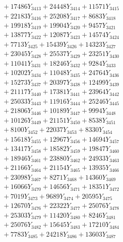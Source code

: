 \documentclass[a4paper,10pt]{article}
\begin{document}
{\begin{align}
&\;  + 17486 Y_{3413} + 24448 Y_{3414} + 11571 Y_{3415} \\[0.3ex]
&\;  + 22183 Y_{3416} + 25208 Y_{3417} + 8683 Y_{3418} \\[0.5ex]\allowbreak
&\;  + 19918 Y_{3419} + 19904 Y_{3420} + 9457 Y_{3421} \\[0.3ex]
&\;  + 13877 Y_{3422} + 12087 Y_{3423} + 14574 Y_{3424} \\[0.3ex]
&\;  + 7713 Y_{3425} + 15439 Y_{3426} + 14323 Y_{3427} \\[0.3ex]
&\;  + 23045 Y_{3428} + 25537 Y_{3429} + 23251 Y_{3430} \\[0.3ex]
&\;  + 11041 Y_{3431} + 18246 Y_{3432} + 9284 Y_{3433} \\[0.3ex]
&\;  + 10202 Y_{3434} + 11048 Y_{3435} + 24764 Y_{3436} \\[0.3ex]
&\;  + 15273 Y_{3437} + 20397 Y_{3438} + 12499 Y_{3439} \\[0.3ex]
&\;  + 21117 Y_{3440} + 17381 Y_{3441} + 23964 Y_{3442} \\[0.3ex]
&\;  + 25033 Y_{3443} + 11916 Y_{3444} + 25246 Y_{3445} \\[0.3ex]
&\;  + 21806 Y_{3446} + 10189 Y_{3447} + 9994 Y_{3448} \\[0.5ex]\allowbreak
&\;  + 10126 Y_{3449} + 21151 Y_{3450} + 8538 Y_{3451} \\[0.3ex]
&\;  + 8100 Y_{3452} + 22037 Y_{3453} + 8330 Y_{3454} \\[0.3ex]
&\;  + 15618 Y_{3455} + 12967 Y_{3456} + 14694 Y_{3457} \\[0.3ex]
&\;  + 13417 Y_{3458} + 18582 Y_{3459} + 19847 Y_{3460} \\[0.3ex]
&\;  + 18946 Y_{3461} + 23880 Y_{3462} + 24933 Y_{3463} \\[0.3ex]
&\;  + 21166 Y_{3464} + 21154 Y_{3465} + 13935 Y_{3466} \\[0.3ex]
&\;  + 23098 Y_{3467} + 8271 Y_{3468} + 14360 Y_{3469} \\[0.3ex]
&\;  + 16066 Y_{3470} + 14656 Y_{3471} + 18351 Y_{3472} \\[0.3ex]
&\;  + 7019 Y_{3473} + 9689 Y_{3474} + 20595 Y_{3475} \\[0.3ex]
&\;  + 12670 Y_{3476} + 22322 Y_{3477} + 25076 Y_{3478} \\[0.5ex]\allowbreak
&\;  + 25303 Y_{3479} + 11420 Y_{3480} + 8246 Y_{3481} \\[0.3ex]
&\;  + 25076 Y_{3482} + 15645 Y_{3483} + 17210 Y_{3484} \\[0.3ex]
&\;  + 7783 Y_{3485} + 24218 Y_{3486} + 13603 Y_{3487} \\[0.3ex]

\end{align}}
\end{document}
